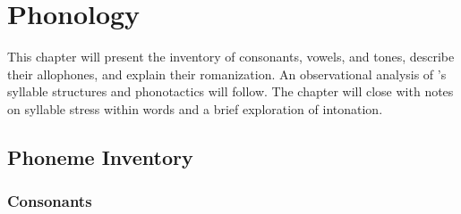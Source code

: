 \chapter{Phonology}
\label{cha:phonology}

This chapter will present the inventory of consonants, vowels, and tones, describe their allophones, and explain their romanization. An observational analysis of \lang{}'s syllable structures and phonotactics will follow. The chapter will close with notes on syllable stress within words and a brief exploration of intonation.

\section{Phoneme Inventory}
\label{sec:phonemes}

\subsection{Consonants}
\label{sec:consonants}


